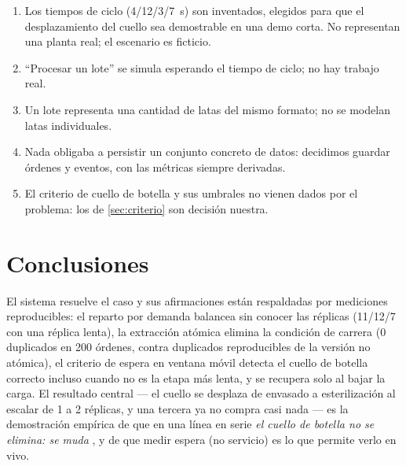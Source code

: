 \documentclass[12pt,a4paper]{article}
\begin{document}
\begin{enumerate}[leftmargin=*]
  \item Los tiempos de ciclo (4/12/3/7~s) son inventados, elegidos para que el
        desplazamiento del cuello sea demostrable en una demo corta. No
        representan una planta real; el escenario es ficticio.
  \item ``Procesar un lote'' se simula esperando el tiempo de ciclo; no hay
        trabajo real.
  \item Un lote representa una cantidad de latas del mismo formato; no se
        modelan latas individuales.
  \item Nada obligaba a persistir un conjunto concreto de datos: decidimos
        guardar órdenes y eventos, con las métricas siempre derivadas.
  \item El criterio de cuello de botella y sus umbrales no vienen dados por el
        problema: los de \ref{sec:criterio} son decisión nuestra.
\end{enumerate}

\section{Conclusiones}

El sistema resuelve el caso y sus afirmaciones
están respaldadas por mediciones reproducibles: el reparto por demanda
balancea sin conocer las réplicas (11/12/7 con una réplica lenta), la
extracción atómica elimina la condición de carrera (0 duplicados en 200
órdenes, contra duplicados reproducibles de la versión no atómica), el criterio de
espera en ventana móvil detecta el cuello de botella correcto incluso cuando no
es la etapa más lenta, y se recupera solo al bajar la carga. El resultado
central — el cuello se desplaza de envasado a esterilización al escalar de 1 a
2 réplicas, y una tercera ya no compra casi nada — es la demostración empírica
de que en una línea en serie \emph{el cuello de botella no se elimina: se
muda} \cite{goldratt}, y de que medir espera (no servicio) es lo que permite
verlo en vivo.
\end{document}
